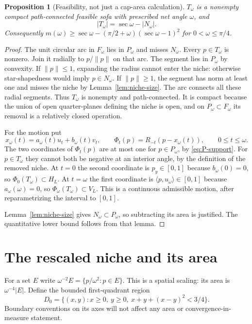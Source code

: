 \documentclass[11pt]{article}
\newtheorem{proposition}[theorem]{Proposition}
\theoremstyle{remark}\newtheorem{remark}[theorem]{Remark}
\newcommand{\area}[1]{\lvert #1\rvert}
\newcommand{\ip}[2]{\langle #1,#2\rangle}
\begin{document}
\begin{proposition}[Feasibility, not just a cap-area calculation]\label{prop:feasible}
$T_\omega$ is a nonempty compact path-connected feasible sofa with prescribed net angle $\omega$, and
\[
 \area{T_\omega}=\sec\omega-\area{N_\omega}.
\]
Consequently $m(\omega)\ge\sec\omega-(\pi/2+\omega)(\sec\omega-1)^2$ for $0<\omega\le\pi/4$.
\end{proposition}
\begin{proof}
The unit circular arc in $F_\omega$ lies in $P_\omega$ and misses $N_\omega$. Every $p\in T_\omega$ is nonzero. Join it radially to $p/\lVert p\rVert$ on that arc. The segment lies in $P_\omega$ by convexity. If $\lVert p\rVert\le1$, expanding the radius cannot enter the niche: otherwise star-shapedness would imply $p\in N_\omega$. If $\lVert p\rVert\ge1$, the segment has norm at least one and misses the niche by Lemma~\ref{lem:niche-size}. The arc connects all these radial segments. Thus $T_\omega$ is nonempty and path-connected. It is compact because the union of open quarter-planes defining the niche is open, and on $P_\omega\subset F_\omega$ its removal is a relatively closed operation.

For the motion put
\[
 x_\omega(t)=a_\omega(t)u_t+b_\omega(t)v_t,\qquad
 \Phi_t(p)=R_{-t}(p-x_\omega(t)),\qquad0\le t\le\omega.
\]
The two coordinates of $\Phi_t(p)$ are at most one for $p\in P_\omega$, by \eqref{eq:P-support}. For $p\in T_\omega$ they cannot both be negative at an interior angle, by the definition of the removed niche. At $t=0$ the second coordinate is $p_y\in[0,1]$ because $b_\omega(0)=0$, so $\Phi_0(T_\omega)\subset H_L$. At $t=\omega$ the first coordinate is $\ip p{u_\omega}\in[0,1]$ because $a_\omega(\omega)=0$, so $\Phi_\omega(T_\omega)\subset V_L$. This is a continuous admissible motion, after reparametrizing the interval to $[0,1]$.

Lemma~\ref{lem:niche-size} gives $N_\omega\subset P_\omega$, so subtracting its area is justified. The quantitative lower bound follows from that lemma.
\end{proof}

\section{The rescaled niche and its area}
For a set $E$ write $\omega^{-2}E=\{p/\omega^2:p\in E\}$. This is a spatial scaling: its area is $\omega^{-4}\area E$.
Define the bounded first-quadrant region
\begin{equation}\label{eq:D}
 D_0=\{(x,y):x\ge0,\ y\ge0,\ x+y+(x-y)^2<3/4\}.
\end{equation}
Boundary conventions on its axes will not affect any area or convergence-in-measure statement.
\end{document}
